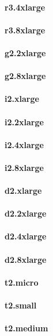 \documentclass{acm_proc_article-sp}
\begin{document}
\paragraph{r3.4xlarge}
\paragraph{r3.8xlarge}
\paragraph{g2.2xlarge}
\paragraph{g2.8xlarge}
\paragraph{i2.xlarge}
\paragraph{i2.2xlarge}
\paragraph{i2.4xlarge}
\paragraph{i2.8xlarge}
\paragraph{d2.xlarge}
\paragraph{d2.2xlarge}
\paragraph{d2.4xlarge}
\paragraph{d2.8xlarge}
\paragraph{t2.micro}
\paragraph{t2.small}
\paragraph{t2.medium}
\end{document}
